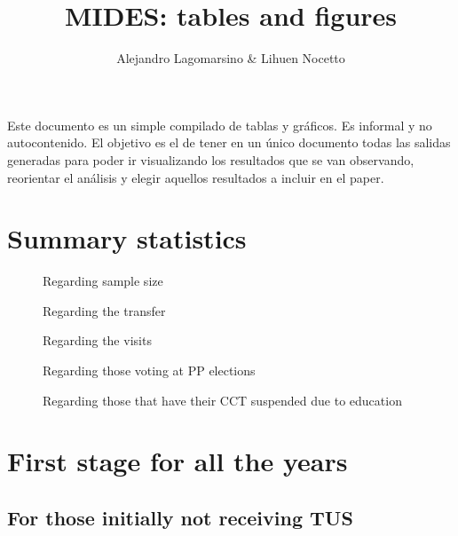 \documentclass[12pt]{article}
\title{MIDES: tables and figures}
\author{Alejandro Lagomarsino \& Lihuen Nocetto}
\begin{document}
\maketitle	

Este documento es un simple compilado de tablas y gráficos. Es informal y no autocontenido. El objetivo es el de tener en un único documento todas las salidas generadas para poder ir visualizando los resultados que se van observando, reorientar el análisis y elegir aquellos resultados a incluir en el paper. 


\tableofcontents

\section{Summary statistics}
\begin{figure}[H]
\caption{Regarding sample size}

\centering
\label{fig:summStats1}
\end{figure}

\begin{figure}[H]
	\caption{Regarding the transfer}
	
	\centering
	\label{fig:summStats2}
\end{figure}

\begin{figure}[H]
	\caption{Regarding the visits}
	
	\centering
	\label{fig:summStats3}
\end{figure}

\begin{figure}[H]
	\caption{Regarding those voting at PP elections}
	
	\centering
	\label{fig:summStats4}
\end{figure}

\begin{figure}[H]
	\caption{Regarding those that have their CCT suspended due to education}
	
	\centering
	\label{fig:summStats5}
\end{figure}

\section{First stage for all the years}

\subsection{For those initially not receiving TUS}
\end{document}
